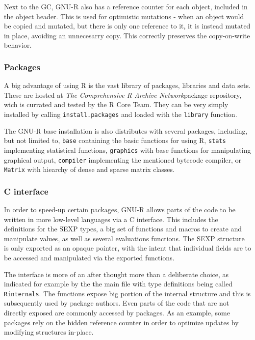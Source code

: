 Next to the GC, GNU-R also has a reference counter for each object, included in the object header. This is used for optimistic mutations - when an object would be copied and mutated, but there is only one reference to it, it is instead mutated in place, avoiding an unnecesarry copy. This correctly preserves the copy-on-write behavior.

\subsubsection*{Packages}

A big advantage of using R is the vast library of packages, libraries and data sets. These are hosted at \textit{The Comprehensive R Archive Network}\todocite package repository, wich is currated and tested by the R Core Team. They can be very simply installed by calling \texttt{install.packages} and loaded with the \texttt{library} function.

The GNU-R base installation is also distributes with several packages, including, but not limited to, \texttt{base} containing the basic functions for using R, \texttt{stats} implementing statistical functions, \texttt{graphics} with base functions for manipulating graphical output, \texttt{compiler} implementing the mentioned bytecode compiler, or \texttt{Matrix} with hiearchy of dense and sparse matrix classes.

\subsubsection*{C interface}

In order to speed-up certain packages, GNU-R allows parts of the code to be written in more low-level languages via a C interface. This includes the definitions for the SEXP types, a big set of functions and macros to create and manipulate values, as well as several evaluations functions. The SEXP structure is only exported as an opaque pointer, with the intent that individual fields are to be accessed and manipulated via the exported functions.

The interface is more of an after thought more than a deliberate choice, as indicated for example by the the main file with type definitions being called \texttt{Rinternals}. The functions expose big portion of the internal structure and this is subsequently used by package authors. Even parts of the code that are not directly exposed are commonly accessed by packages. As an example, some packages rely on the hidden reference counter in order to optimize updates by modifying structures in-place.


